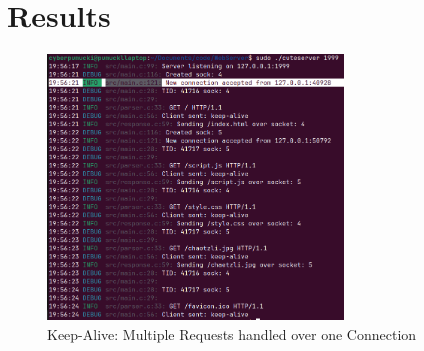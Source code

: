 \section*{Results}

\begin{figure}[h]
	\centering
	\includegraphics[width=0.7\textwidth]{figures/keep-alive.png}
	\caption{Keep-Alive: Multiple Requests handled over one Connection}
\end{figure}

